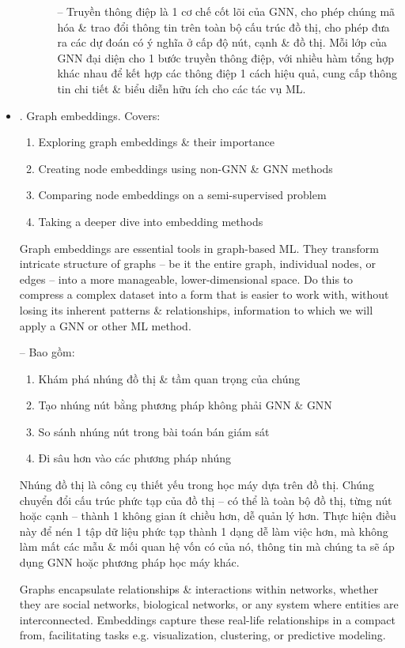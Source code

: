\documentclass{article}
\begin{document}
\begin{itemize}
\begin{itemize}
\begin{itemize}
            -- Truyền thông điệp là 1 cơ chế cốt lõi của GNN, cho phép chúng mã hóa \& trao đổi thông tin trên toàn bộ cấu trúc đồ thị, cho phép đưa ra các dự đoán có ý nghĩa ở cấp độ nút, cạnh \& đồ thị. Mỗi lớp của GNN đại diện cho 1 bước truyền thông điệp, với nhiều hàm tổng hợp khác nhau để kết hợp các thông điệp 1 cách hiệu quả, cung cấp thông tin chi tiết \& biểu diễn hữu ích cho các tác vụ ML.
        \end{itemize}
    \end{itemize}
    \item {. Graph embeddings.} Covers:
    \begin{enumerate}
        \item Exploring graph embeddings \& their importance
        \item Creating node embeddings using non-GNN \& GNN methods
        \item Comparing node embeddings on a semi-supervised problem
        \item Taking a deeper dive into embedding methods
    \end{enumerate}
    Graph embeddings are essential tools in graph-based ML. They transform intricate structure of graphs -- be it the entire graph, individual nodes, or edges -- into a more manageable, lower-dimensional space. Do this to compress a complex dataset into a form that is easier to work with, without losing its inherent patterns \& relationships, information to which we will apply a GNN or other ML method.

    -- Bao gồm:
    \begin{enumerate}
        \item Khám phá nhúng đồ thị \& tầm quan trọng của chúng
        \item Tạo nhúng nút bằng phương pháp không phải GNN \& GNN
        \item So sánh nhúng nút trong bài toán bán giám sát
        \item Đi sâu hơn vào các phương pháp nhúng
    \end{enumerate}
    Nhúng đồ thị là công cụ thiết yếu trong học máy dựa trên đồ thị. Chúng chuyển đổi cấu trúc phức tạp của đồ thị -- có thể là toàn bộ đồ thị, từng nút hoặc cạnh -- thành 1 không gian ít chiều hơn, dễ quản lý hơn. Thực hiện điều này để nén 1 tập dữ liệu phức tạp thành 1 dạng dễ làm việc hơn, mà không làm mất các mẫu \& mối quan hệ vốn có của nó, thông tin mà chúng ta sẽ áp dụng GNN hoặc phương pháp học máy khác.

    Graphs encapsulate relationships \& interactions within networks, whether they are social networks, biological networks, or any system where entities are interconnected. Embeddings capture these real-life relationships in a compact from, facilitating tasks e.g. visualization, clustering, or predictive modeling.


\end{itemize}
\end{document}
